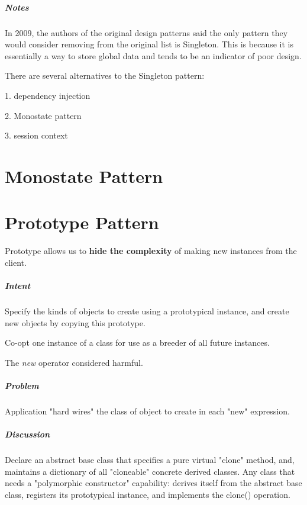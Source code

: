 \documentclass{book}
\begin{document}
\paragraph{Notes}
In 2009, the authors of the original design patterns said the only pattern they would consider removing from the original list is Singleton.
This is because it is essentially a way to store global data and tends to be an indicator of poor design.

There are several alternatives to the Singleton pattern:

1.    dependency injection

2.    Monostate pattern

3.    session context

\chapter{Monostate Pattern}\label{MonostatePattern}
\chapter{Prototype Pattern}\label{PrototypePattern}

Prototype allows us to \textbf{hide the complexity} of making new instances from the client. %
\paragraph{Intent}

    Specify the kinds of objects to create using a prototypical instance, and create new objects by copying this prototype.

    Co-opt one instance of a class for use as a breeder of all future instances.

    The \textit{new} operator considered harmful.

\paragraph{Problem}
Application "hard wires" the class of object to create in each "new" expression.
\paragraph{Discussion}

Declare an abstract base class that specifies a pure virtual "clone" method, and, maintains a dictionary of all "cloneable" concrete derived classes.
Any class that needs a "polymorphic constructor" capability: derives itself from the abstract base class, registers its prototypical instance, and implements the clone() operation.
\end{document}
